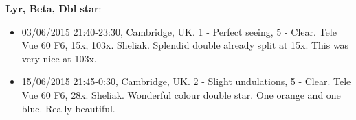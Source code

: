 {\bf Lyr, Beta, Dbl star}:
\begin{itemize}
\item 03/06/2015 21:40-23:30, Cambridge, UK. 1 - Perfect seeing, 5 - Clear. Tele Vue 60 F6, 15x, 103x. Sheliak. Splendid double already split at 15x. This was very nice at 103x. 
\item 15/06/2015 21:45-0:30, Cambridge, UK. 2 - Slight undulations, 5 - Clear. Tele Vue 60 F6, 28x. Sheliak. Wonderful colour double star. One orange and one blue. Really beautiful.
\end{itemize}

